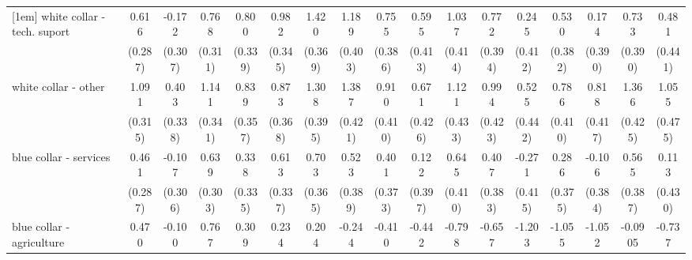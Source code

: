 {\begin{tabular}{l*{16}{c}}
[1em]
white collar - tech. suport&       0.616\sym{*}  &      -0.172         &       0.768\sym{*}  &       0.800\sym{*}  &       0.982\sym{**} &       1.420\sym{***}&       1.189\sym{**} &       0.755         &       0.595         &       1.037\sym{*}  &       0.772         &       0.245         &       0.530         &       0.174         &       0.733         &       0.481         \\
                    &     (0.287)         &     (0.307)         &     (0.311)         &     (0.339)         &     (0.345)         &     (0.369)         &     (0.403)         &     (0.386)         &     (0.413)         &     (0.414)         &     (0.394)         &     (0.412)         &     (0.382)         &     (0.390)         &     (0.390)         &     (0.441)         \\
[1em]
white collar - other&       1.091\sym{***}&       0.403         &       1.141\sym{***}&       0.839\sym{*}  &       0.873\sym{*}  &       1.308\sym{***}&       1.387\sym{***}&       0.910\sym{*}  &       0.671         &       1.121\sym{**} &       0.994\sym{*}  &       0.525         &       0.786         &       0.818\sym{*}  &       1.366\sym{**} &       1.055\sym{*}  \\
                    &     (0.315)         &     (0.338)         &     (0.341)         &     (0.357)         &     (0.368)         &     (0.395)         &     (0.421)         &     (0.410)         &     (0.426)         &     (0.433)         &     (0.423)         &     (0.442)         &     (0.410)         &     (0.417)         &     (0.425)         &     (0.475)         \\
[1em]
blue collar - services&       0.461         &      -0.107         &       0.639\sym{*}  &       0.338         &       0.613         &       0.703         &       0.523         &       0.401         &       0.122         &       0.645         &       0.407         &      -0.271         &       0.286         &      -0.106         &       0.565         &       0.113         \\
                    &     (0.287)         &     (0.306)         &     (0.303)         &     (0.335)         &     (0.337)         &     (0.365)         &     (0.389)         &     (0.373)         &     (0.397)         &     (0.410)         &     (0.383)         &     (0.415)         &     (0.375)         &     (0.384)         &     (0.387)         &     (0.430)         \\
[1em]
blue collar - agriculture&       0.470         &      -0.100         &       0.767         &       0.309         &       0.234         &       0.204         &      -0.244         &      -0.410         &      -0.442         &      -0.798         &      -0.657         &      -1.203\sym{*}  &      -1.055\sym{*}  &      -1.052\sym{*}  &     -0.0905         &      -0.737         \\

\end{tabular}}
